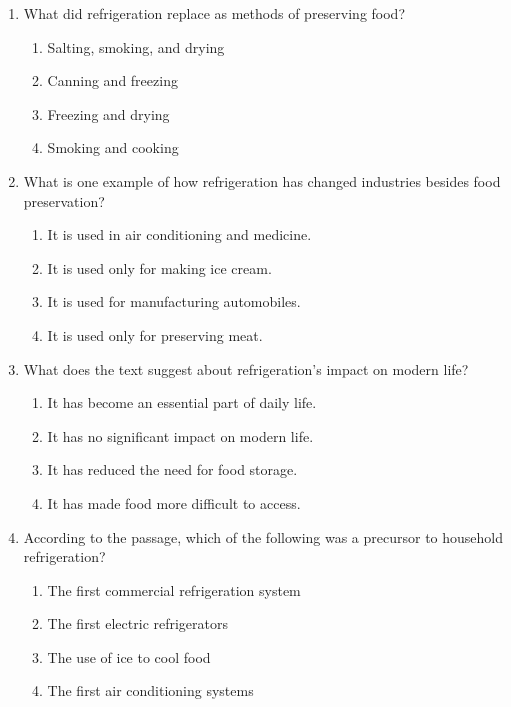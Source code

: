 \documentclass[12pt]{article}
\begin{document}
\begin{enumerate}
    \item What did refrigeration replace as methods of preserving food?
    \begin{enumerate}[label=\Alph*.]
        \item Salting, smoking, and drying
        \item Canning and freezing
        \item Freezing and drying
        \item Smoking and cooking
    \end{enumerate}
    \vspace{0.5cm}

    \item What is one example of how refrigeration has changed industries besides food preservation?
    \begin{enumerate}[label=\Alph*.]
        \item It is used in air conditioning and medicine.
        \item It is used only for making ice cream.
        \item It is used for manufacturing automobiles.
        \item It is used only for preserving meat.
    \end{enumerate}
    \vspace{0.5cm}

    \item What does the text suggest about refrigeration's impact on modern life?
    \begin{enumerate}[label=\Alph*.]
        \item It has become an essential part of daily life.
        \item It has no significant impact on modern life.
        \item It has reduced the need for food storage.
        \item It has made food more difficult to access.
    \end{enumerate}
    \vspace{0.5cm}

    \item According to the passage, which of the following was a precursor to household refrigeration?
    \begin{enumerate}[label=\Alph*.]
        \item The first commercial refrigeration system
        \item The first electric refrigerators
        \item The use of ice to cool food
        \item The first air conditioning systems
    \end{enumerate}
    \vspace{0.5cm}


\end{enumerate}
\end{document}
